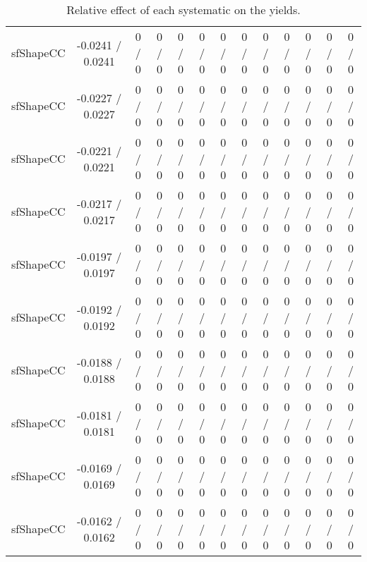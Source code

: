 \documentclass[10pt]{article}
\begin{document}
\begin{table}[htbp]
\begin{center}
\begin{tabular}{|c|c|c|c|c|c|c|c|c|c|c|c|c|}
  sfShapeCC & -0.0241 / 0.0241 & 0 / 0 & 0 / 0 & 0 / 0 & 0 / 0 & 0 / 0 & 0 / 0 & 0 / 0 & 0 / 0 & 0 / 0 & 0 / 0 & 0 / 0 \\ 
  sfShapeCC & -0.0227 / 0.0227 & 0 / 0 & 0 / 0 & 0 / 0 & 0 / 0 & 0 / 0 & 0 / 0 & 0 / 0 & 0 / 0 & 0 / 0 & 0 / 0 & 0 / 0 \\ 
  sfShapeCC & -0.0221 / 0.0221 & 0 / 0 & 0 / 0 & 0 / 0 & 0 / 0 & 0 / 0 & 0 / 0 & 0 / 0 & 0 / 0 & 0 / 0 & 0 / 0 & 0 / 0 \\ 
  sfShapeCC & -0.0217 / 0.0217 & 0 / 0 & 0 / 0 & 0 / 0 & 0 / 0 & 0 / 0 & 0 / 0 & 0 / 0 & 0 / 0 & 0 / 0 & 0 / 0 & 0 / 0 \\ 
  sfShapeCC & -0.0197 / 0.0197 & 0 / 0 & 0 / 0 & 0 / 0 & 0 / 0 & 0 / 0 & 0 / 0 & 0 / 0 & 0 / 0 & 0 / 0 & 0 / 0 & 0 / 0 \\ 
  sfShapeCC & -0.0192 / 0.0192 & 0 / 0 & 0 / 0 & 0 / 0 & 0 / 0 & 0 / 0 & 0 / 0 & 0 / 0 & 0 / 0 & 0 / 0 & 0 / 0 & 0 / 0 \\ 
  sfShapeCC & -0.0188 / 0.0188 & 0 / 0 & 0 / 0 & 0 / 0 & 0 / 0 & 0 / 0 & 0 / 0 & 0 / 0 & 0 / 0 & 0 / 0 & 0 / 0 & 0 / 0 \\ 
  sfShapeCC & -0.0181 / 0.0181 & 0 / 0 & 0 / 0 & 0 / 0 & 0 / 0 & 0 / 0 & 0 / 0 & 0 / 0 & 0 / 0 & 0 / 0 & 0 / 0 & 0 / 0 \\ 
  sfShapeCC & -0.0169 / 0.0169 & 0 / 0 & 0 / 0 & 0 / 0 & 0 / 0 & 0 / 0 & 0 / 0 & 0 / 0 & 0 / 0 & 0 / 0 & 0 / 0 & 0 / 0 \\ 
  sfShapeCC & -0.0162 / 0.0162 & 0 / 0 & 0 / 0 & 0 / 0 & 0 / 0 & 0 / 0 & 0 / 0 & 0 / 0 & 0 / 0 & 0 / 0 & 0 / 0 & 0 / 0 \\ 
\hline 
\end{tabular} 
\caption{Relative effect of each systematic on the yields.} 
\end{center} 
\end{table} 
\end{document}
